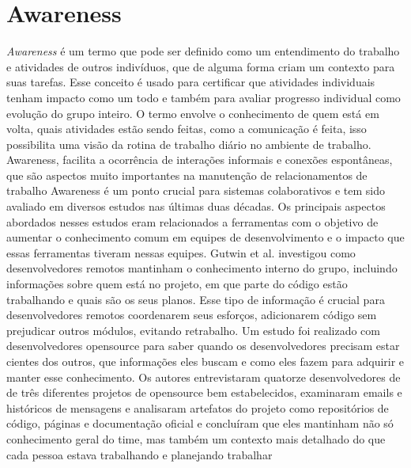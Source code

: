 \section{Awareness} 
\textit{Awareness} é um termo que pode ser definido como um entendimento do trabalho e atividades de outros indivíduos, que de alguma forma criam um contexto para suas tarefas. Esse conceito é usado para certificar que atividades individuais tenham impacto como um todo e também para avaliar progresso individual como evolução do grupo inteiro. O termo envolve o conhecimento de quem está em volta, quais atividades estão sendo feitas, como a comunicação é feita, isso possibilita uma visão da rotina de trabalho diário no ambiente de trabalho. Awareness, facilita a ocorrência de interações informais e conexões espontâneas, que são aspectos muito importantes na manutenção de relacionamentos de trabalho
	Awareness é um ponto crucial para sistemas colaborativos e tem sido avaliado em diversos estudos nas últimas duas décadas. Os principais aspectos abordados nesses estudos eram relacionados a ferramentas com o objetivo de aumentar o conhecimento comum em equipes de desenvolvimento e o impacto que essas ferramentas tiveram nessas equipes. 
    Gutwin et al. investigou como desenvolvedores remotos mantinham o conhecimento interno do grupo, incluindo informações sobre quem está no projeto, em que parte do código estão trabalhando e quais são os seus planos. Esse tipo de informação é crucial para desenvolvedores remotos coordenarem seus esforços, adicionarem código sem prejudicar outros módulos, evitando retrabalho. Um estudo foi realizado com desenvolvedores opensource para saber quando os desenvolvedores precisam estar cientes dos outros, que informações eles buscam e como eles fazem para adquirir e manter esse conhecimento. Os autores entrevistaram quatorze desenvolvedores de de três diferentes projetos de opensource bem estabelecidos, examinaram emails e históricos de mensagens e analisaram artefatos do projeto como repositórios de código, páginas e documentação oficial e concluíram que eles mantinham não só conhecimento geral do time, mas também um contexto mais detalhado do que cada pessoa estava trabalhando e planejando trabalhar
